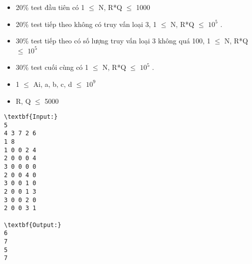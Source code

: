 \begin{itemize}
	\item 20\% test đầu tiên có 1  $\le$  N, R*Q  $\le$  1000
	\item 20\% test tiếp theo không có truy vấn loại 3, 1  $\le$  N, R*Q  $\le$  $10^{5}$ .
	\item 30\% test tiếp theo có số lượng truy vấn loại 3 không quá 100, 1  $\le$  N, R*Q  $\le$  $10^{5}$
	\item 30\% test cuối cùng có 1  $\le$  N, R*Q  $\le$  $10^{5}$ .
	\item 1  $\le$  Ai, a, b, c, d  $\le$  $10^{9}$
	\item R, Q  $\le$  5000
\end{itemize}
\begin{verbatim}
\textbf{Input:}
5
4 3 7 2 6
1 8
1 0 0 2 4
2 0 0 0 4
3 0 0 0 0
2 0 0 4 0
3 0 0 1 0
2 0 0 1 3
3 0 0 2 0
2 0 0 3 1

\textbf{Output:}
6
7
5
7
\end{verbatim}